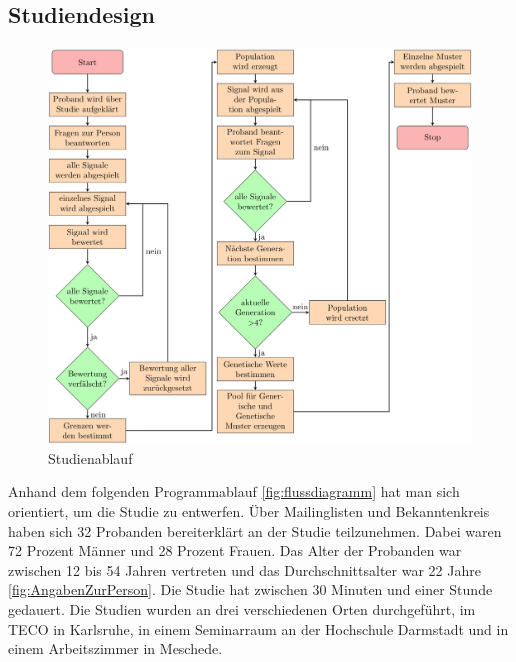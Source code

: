 

\subsection{Studiendesign}

\begin{figure}
	\centering
    \includegraphics[width=\textwidth]{pics/analyse/Programmablaufdiagramm.png}
    \caption{Studienablauf}
    \label{fig:flussdiagramm}
\end{figure}

Anhand dem folgenden Programmablauf \autoref{fig:flussdiagramm} hat man sich orientiert, um die Studie zu entwerfen. 
{\"U}ber Mailinglisten und Bekanntenkreis haben sich 32 Probanden bereiterkl{\"a}rt an der Studie teilzunehmen. 
Dabei waren 72 Prozent M{\"a}nner und 28 Prozent Frauen. 
Das Alter der Probanden war zwischen 12 bis 54 Jahren vertreten und das Durchschnittsalter war 22 Jahre \autoref{fig:AngabenZurPerson}.  
Die Studie hat zwischen 30 Minuten und einer Stunde gedauert.
Die Studien wurden an drei verschiedenen Orten durchgef{\"u}hrt, im TECO in Karlsruhe, in einem Seminarraum an der Hochschule Darmstadt und in einem Arbeitszimmer in Meschede.

